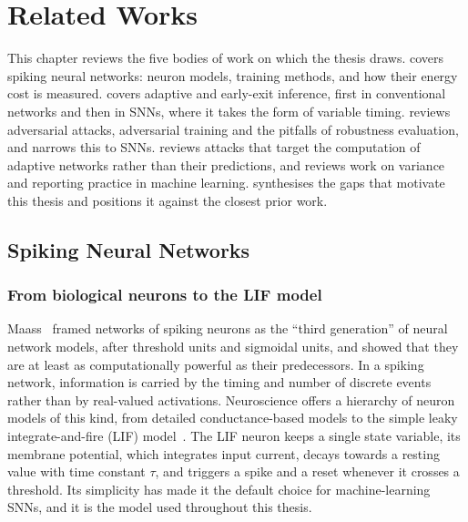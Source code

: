 \chapter{Related Works}
\label{ch:related}

This chapter reviews the five bodies of work on which the thesis draws.  covers spiking neural networks: neuron models, training methods, and how their energy cost is measured.  covers adaptive and early-exit inference, first in conventional networks and then in SNNs, where it takes the form of variable timing.  reviews adversarial attacks, adversarial training and the pitfalls of robustness evaluation, and  narrows this to SNNs.  reviews attacks that target the computation of adaptive networks rather than their predictions, and  reviews work on variance and reporting practice in machine learning.  synthesises the gaps that motivate this thesis and positions it against the closest prior work.

\section{Spiking Neural Networks}
\label{sec:rw-snn}

\subsection{From biological neurons to the LIF model}

Maass~\cite{maass1997networks} framed networks of spiking neurons as the ``third generation'' of neural network models, after threshold units and sigmoidal units, and showed that they are at least as computationally powerful as their predecessors. In a spiking network, information is carried by the timing and number of discrete events rather than by real-valued activations. Neuroscience offers a hierarchy of neuron models of this kind, from detailed conductance-based models to the simple leaky integrate-and-fire (LIF) model~\cite{gerstner2014neuronal}. The LIF neuron keeps a single state variable, its membrane potential, which integrates input current, decays towards a resting value with time constant $\tau$, and triggers a spike and a reset whenever it crosses a threshold. Its simplicity has made it the default choice for machine-learning SNNs, and it is the model used throughout this thesis.

